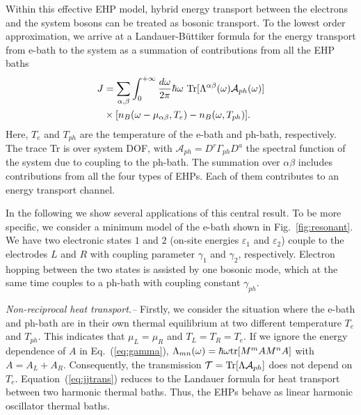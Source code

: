 \documentclass[aps
,twocolumn
,floatfix,footinbib,prl,longbibliography
]{revtex4-1}
\begin{document}
Within this effective EHP model, hybrid energy transport between the electrons and the system bosons can be treated as bosonic transport.
To the lowest order approximation, we arrive at a Landauer-B\"uttiker formula for the energy transport from e-bath to the system as a summation of contributions from all the EHP baths
\begin{align}
J &= \sum_{\alpha,\beta}\int_0^{+\infty}\frac{d\omega}{2\pi}\hbar\omega\ {\rm Tr}[\Lambda^{\alpha\beta}(\omega)\mathcal{A}_{ph}(\omega)]\nonumber\\
&\times [n_B(\omega-\mu_{\alpha\beta},{T}_{e})-n_B(\omega,T_{ph})].
\label{eq:jjtrans}
\end{align}
Here, $T_e$ and $T_{ph}$ are the temperature of the e-bath and ph-bath, respectively. The trace Tr is over system DOF, with $\mathcal{A}_{ph}=D^r \Gamma_{ph} D^a$ the spectral function of the system due to coupling to the ph-bath. The summation over $\alpha\beta$ includes contributions from all the four types of EHPs. Each of them contributes to an energy transport channel. 

In the following we show several applications of this central result.
To be more specific, we consider a minimum model of the e-bath shown in Fig.~\ref{fig:resonant}. We have two electronic states $1$ and $2$ (on-site energies $\varepsilon_1$ and $\varepsilon_2$) couple to the electrodes $L$ and $R$ with coupling parameter $\gamma_1$ and $\gamma_2$, respectively. 
Electron hopping between the two states is assisted by one bosonic mode, which at the same time couples to a ph-bath with coupling constant $\gamma_{ph}$.

\emph{Non-reciprocal heat transport.--}
Firstly, we consider the situation where the e-bath and ph-bath are in their own thermal equilibrium at two different temperature $T_e$ and $T_{ph}$. This indicates that  $\mu_{L}=\mu_{R}$ and $T_{L}=T_R=T_e$. 
If we ignore the energy dependence of $A$ in Eq.~(\ref{eq:gamma}),
$\Lambda_{mn}(\omega)=\hbar\omega{\rm tr}[M^m A M^n A]$
with $A=A_L+A_R$. Consequently,  the transmission $\mathcal{T}={\rm Tr}[\Lambda\mathcal{A}_{ph}]$ does not depend on $T_e$. Equation~(\ref{eq:jjtrans}) reduces to the Landauer formula for heat transport between two harmonic thermal baths. Thus, the EHPs behave as linear harmonic oscillator thermal baths. 
\end{document}
